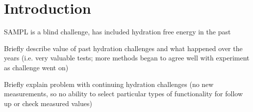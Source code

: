 
\author{Caitlin C Bannan         \and
        Kalistyn H Burley \and
        David L Mobley
}





\date{Received: date / Accepted: date}


\maketitle

\begin{abstract}
\end{abstract}




\section{Introduction}
\label{intro}
SAMPL is a blind challenge, has included hydration free energy in the past

Briefly describe value of past hydration challenges and what happened over the years (i.e. very valuable tests; more methods began to agree well with experiment as challenge went on)

Briefly explain problem with continuing hydration challenges (no new measurements, so no ability to select particular types of functionality for follow up or check measured values)

